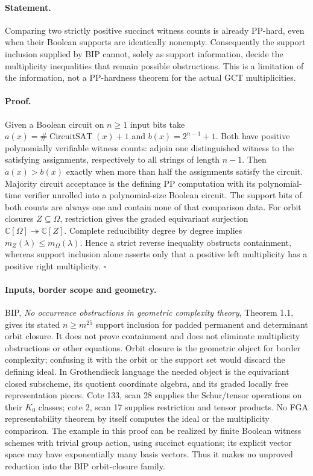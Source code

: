 \paragraph{Statement.}
Comparing two strictly positive succinct witness counts
is already PP-hard, even when their Boolean supports are
identically nonempty. Consequently the support inclusion
supplied by BIP cannot, solely as support information,
decide the multiplicity inequalities that remain possible
obstructions. This is a limitation of the information,
not a PP-hardness theorem for the actual GCT multiplicities.

\paragraph{Proof.}
Given a Boolean circuit on $n\ge1$ input bits take
$a(x)=\#\operatorname{CircuitSAT}(x)+1$ and
$b(x)=2^{n-1}+1$. Both have positive polynomially
verifiable witness counts: adjoin one distinguished
witness to the satisfying assignments, respectively to
all strings of length $n-1$. Then
$a(x)>b(x)$ exactly when more than half the assignments
satisfy the circuit. Majority circuit acceptance is the
defining PP computation with its polynomial-time verifier
unrolled into a polynomial-size Boolean circuit. The support bits of both counts are
always one and contain none of that comparison data.
For orbit closures $Z\subseteq\Omega$, restriction gives
the graded equivariant surjection
$\mathbb C[\Omega]\twoheadrightarrow\mathbb C[Z]$.
Complete reducibility degree by degree implies
$m_Z(\lambda)\le m_\Omega(\lambda)$. Hence a strict
reverse inequality obstructs containment, whereas
support inclusion alone asserts only that a positive
left multiplicity has a positive right multiplicity.
\hfill$\square$

\paragraph{Inputs, border scope and geometry.}
BIP, \emph{No occurrence obstructions in geometric
complexity theory}, Theorem 1.1, gives its stated
$n\ge m^{25}$ support inclusion for padded permanent
and determinant orbit closure. It does not prove
containment and does not eliminate multiplicity
obstructions or other equations. Orbit closure is the
geometric object for border complexity; confusing it
with the orbit or the support set would discard the
defining ideal. In Grothendieck language the needed
object is the equivariant closed subscheme, its
quotient coordinate algebra, and its graded locally
free representation pieces. Cote 133, scan 28 supplies
the Schur/tensor operations on their $K_0$ classes;
cote 2, scan 17 supplies restriction and tensor products.
No FGA representability theorem by itself computes the
ideal or the multiplicity comparison. The example in
this proof can be realized by finite Boolean witness
schemes with trivial group action, using succinct
equations; its explicit vector space may have
exponentially many basis vectors. Thus it makes no
unproved reduction into the BIP orbit-closure family.



